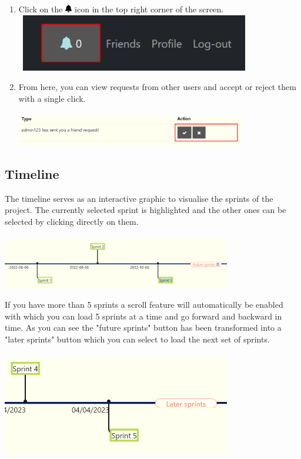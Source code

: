\documentclass{article}
\begin{document}
\begin{enumerate}
    \item Click on the  \includegraphics[width=0.3cm]{bell-solid.png}  icon in the top right corner of the screen.\\\
    \includegraphics[width=10cm]{notificationNav.png}
    \item From here, you can view requests from other users and accept or reject them with a single click.\\\\
    \includegraphics[width=10cm]{notification.png}
\end{enumerate}  



\subsection{Timeline}

The timeline serves as an interactive graphic to visualise the sprints of the project. The currently selected sprint is highlighted and the other ones can be selected by clicking directly on them. \\\\
\includegraphics[width=10cm]{timeline.png}

If you have more than 5 sprints a scroll feature will automatically be enabled with which you can load 5 sprints at a time and go forward and backward in time. As you can see the "future sprints" button has been transformed into a "later sprints" button which you can select to load the next set of sprints.\\\\
\includegraphics[width=10cm]{timelineMore.png}\\\\\\
\end{document}

